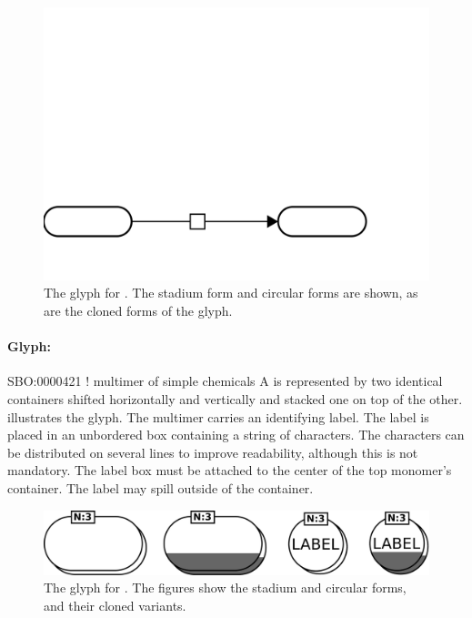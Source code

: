 \begin{figure}[htb]
  \centering
  \includegraphics[scale = 0.3]{images/simpleChemical}
  \caption{The \PD glyph for . The stadium
    form and circular forms are shown, as are the cloned forms of the glyph.}
  \label{fig:techref:simpleChemical}
\end{figure}

\paragraph{Glyph: }

\begin{glyphDescription}
\glyphSboTerm SBO:0000421 ! multimer of simple chemicals
\glyphContainer  A  is represented by two identical containers shifted horizontally and vertically and stacked one on top of the other.   illustrates the glyph.
\glyphLabel The multimer carries an identifying label.  The label is placed in an unbordered box containing a string of characters.  The characters can be distributed on several lines to improve readability, although this is not mandatory.  The label box must be attached to the center of the top monomer's container.  The label may spill outside of the container.
\end{glyphDescription}

\begin{figure}[htb]
  \centering
  \includegraphics[scale = 0.3]{images/simpleChemicalMultimer}
  \caption{The \PD glyph for . The
    figures show the stadium and circular forms, and their cloned variants.}
  \label{fig:techref:simpleChemicalMultimer}
\end{figure}

